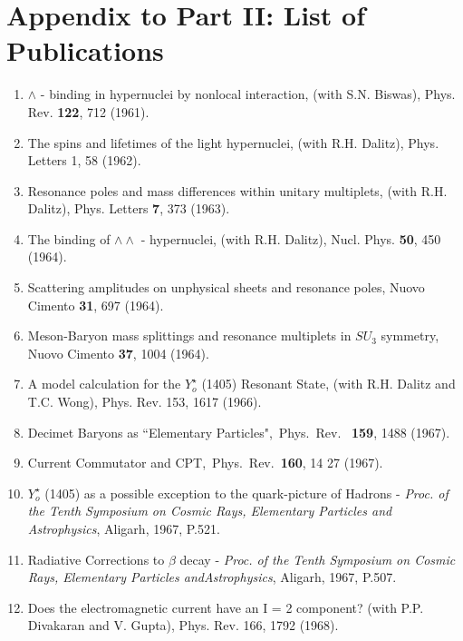 \chapter{Appendix to Part II: List of Publications}

\begin{enumerate}
\itemsep=0pt
\item $\wedge$ - binding in hypernuclei by nonlocal interaction, (with
S.N. Biswas),  Phys. Rev. {\bf 122}, 712 (1961). 

\item The spins and lifetimes of the light hypernuclei, (with R.H.
Dalitz), Phys. Letters {1}, 58 (1962).

\item Resonance poles and mass differences within unitary multiplets, 
(with R.H. Dalitz), Phys. Letters {\bf 7}, 373 (1963).

\item The binding of $\wedge \wedge$ - hypernuclei, (with R.H. Dalitz), 
Nucl. Phys. {\bf 50}, 450 (1964).

\item Scattering amplitudes on unphysical sheets and resonance poles, 
Nuovo Cimento {\bf 31}, 697 (1964).

\item Meson-Baryon mass splittings and resonance multiplets in $SU_3$
symmetry, Nuovo Cimento {\bf 37}, 1004 (1964).

\item A model calculation for the $Y^\star_o$ (1405) Resonant State, 
(with R.H. Dalitz and T.C. Wong), Phys. Rev. 153, 1617 (1966).

\item Decimet Baryons as ``Elementary Particles",\ Phys.\ Rev.\ {\bf
159}, 1488 (1967).

\item Current Commutator and CPT,\ Phys.\ Rev.\ {\bf 160}, 14 27 (1967).

\item $Y^\star_o$ (1405) as a possible exception to the quark-picture of
Hadrons - {\it Proc. of the Tenth Symposium on Cosmic Rays, Elementary
Particles and Astrophysics}, Aligarh, 1967, P.521.

\item Radiative Corrections to $\beta$ decay - {\it Proc. of the Tenth\break
Symposium on Cosmic Rays, Elementary Particles and\break Astrophysics}, 
Aligarh, 1967, P.507.

\item Does the electromagnetic current have an I = 2 component? (with
P.P. Divakaran and V. Gupta), Phys. Rev. 166, 1792 (1968).


\end{enumerate}

